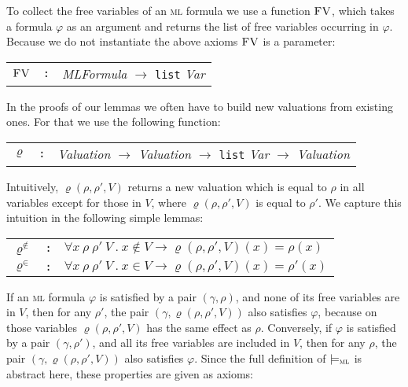 \documentclass[conference]{IEEEtran}
\newcommand{\FreeVars}{\mathit{\textsc{FV}}}
\newcommand{\ML}{\textsc{ml}\xspace}
\newcommand{\modelsml}{\models_\ML}
\newcommand{\coq}[1]{{\small \textit{#1}}}
\newcommand{\coqtt}[1]{{\small \texttt{#1}}}
\newcommand{\cforall}{\pmb{\forall}}
\newcommand{\cimplies}{\pmb{\rightarrow}}
\newcommand{\extend}[3]{\varrho({#1},{#2},{#3})}
\begin{document}
To collect the free variables of an \ML formula we use a function $\FreeVars$, which takes a formula $\varphi$ as an argument and returns the list of free variables occurring in $\varphi$.
Because we do not instantiate the above axioms $\FreeVars$ is a parameter:\\

\begin{minipage}{\textwidth}
\begin{tabular}{lcl}
$\FreeVars$ & \coqtt{:}& \coq{MLFormula} $\to$ \coqtt{list} \coq{Var}\\[2ex]
\end{tabular}
\end{minipage}


In the proofs of our lemmas we often have to build new valuations from existing ones.
For that we use the following function: \\

\noindent
\begin{minipage}{\textwidth}
\begin{tabular}{lcl}
$\varrho$ & \coqtt{:}& \coq{Valuation} $\to$ \coq{Valuation} $\to$ \coqtt{list} \coq{Var} $\to$ \coq{Valuation}\\[2ex]
\end{tabular}
\end{minipage}

\noindent
Intuitively, $\extend{\rho}{\rho'}{V}$ returns a new valuation which is equal to $\rho$ in all variables except for those in $V$, where $\extend{\rho}{\rho'}{V}$ is equal to $\rho'$.
We capture this intuition in the following simple lemmas:\\

\noindent
 \begin{minipage}{\textwidth}
\begin{tabular}{lcl}
$\varrho^{\not\in}$ & \coqtt{:}& $\cforall x~\rho~\rho'~V~.~ x \not\in V \cimplies \extend{\rho}{\rho'}{V}(x) = \rho(x)$\\
$\varrho^\in$ & \coqtt{:}& $\cforall x~\rho~\rho'~V~.~ x \in V \cimplies \extend{\rho}{\rho'}{V}(x) = \rho'(x)$\\[2ex]
\end{tabular}
\end{minipage}

\noindent
If an \ML formula $\varphi$ is satisfied by a pair $(\gamma, \rho)$, and none of its free variables are in $V$, then for any $\rho'$, the pair $(\gamma, \extend{\rho}{\rho'}{V})$ also satisfies $\varphi$, because on those variables $\extend{\rho}{\rho'}{V}$ has the same effect as $\rho$.
Conversely, if $\varphi$ is satisfied by a pair $(\gamma, \rho')$, and all its free variables are included in $V$, then for any $\rho$, the pair $(\gamma, \extend{\rho}{\rho'}{V})$ also satisfies $\varphi$.
Since the full definition of $\modelsml$ is abstract here, these properties are given as axioms:\\
\end{document}
